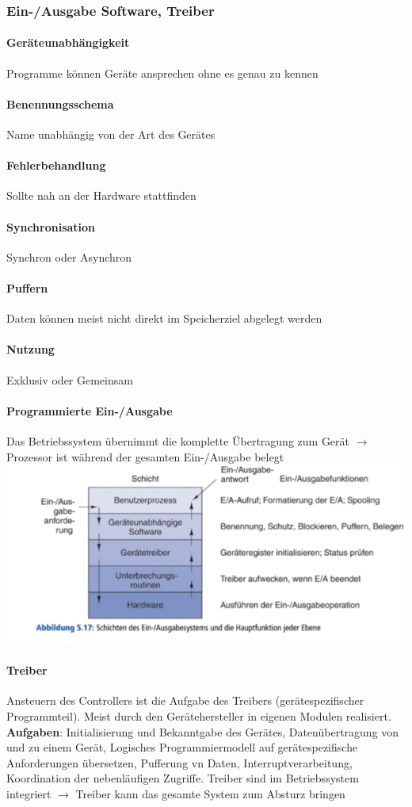 \documentclass[10pt,a4paper,landscape]{article}
\begin{document}
\begin{multicols*}{3}
	\subsubsection{Ein-/Ausgabe Software, Treiber}
	\paragraph{Geräteunabhängigkeit} Programme können Geräte ansprechen ohne es genau zu kennen
	\paragraph{Benennungsschema} Name unabhängig von der Art des Gerätes
	\paragraph{Fehlerbehandlung} Sollte nah an der Hardware stattfinden
	\paragraph{Synchronisation} Synchron oder Asynchron
	\paragraph{Puffern} Daten können meist nicht direkt im Speicherziel abgelegt werden
	\paragraph{Nutzung} Exklusiv oder Gemeinsam
	\paragraph{Programmierte Ein-/Ausgabe} Das Betriebssystem übernimmt die komplette Übertragung zum Gerät $\rightarrow$ Prozessor ist während der gesamten Ein-/Ausgabe belegt\\
	\includegraphics[width=0.95\columnwidth]{einausgabe}
	\paragraph{Treiber} Ansteuern des Controllers ist die Aufgabe des Treibers (gerätespezifischer Programmteil). Meist durch den Gerätehersteller in eigenen Modulen realisiert. \textbf{Aufgaben}: Initialisierung und Bekanntgabe des Gerätes, Datenübertragung von und zu einem Gerät, Logisches Programmiermodell auf gerätespezifische Anforderungen übersetzen, Pufferung vn Daten, Interruptverarbeitung, Koordination der nebenläufigen Zugriffe. Treiber sind im Betriebssystem integriert $\rightarrow$ Treiber kann das gesamte System zum Absturz bringen

\end{multicols*}
\end{document}
